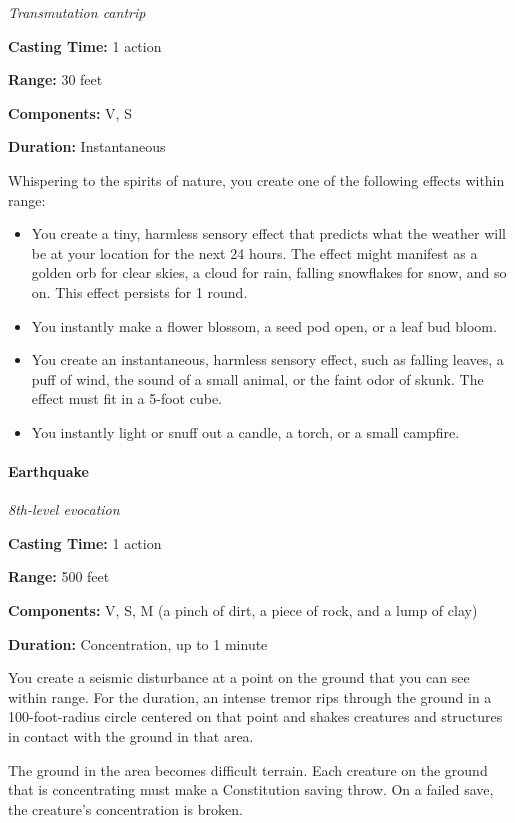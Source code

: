 \documentclass[
]{article}
\providecommand{\tightlist}{%
  \setlength{\itemsep}{0pt}\setlength{\parskip}{0pt}}
\begin{document}
\emph{Transmutation cantrip}

\textbf{Casting Time:} 1 action

\textbf{Range:} 30 feet

\textbf{Components:} V, S

\textbf{Duration:} Instantaneous

Whispering to the spirits of nature, you create one of the following
effects within range:

\begin{itemize}
\tightlist
\item
  You create a tiny, harmless sensory effect that predicts what the
  weather will be at your location for the next 24 hours. The effect
  might manifest as a golden orb for clear skies, a cloud for rain,
  falling snowflakes for snow, and so on. This effect persists for 1
  round.
\item
  You instantly make a flower blossom, a seed pod open, or a leaf bud
  bloom.
\item
  You create an instantaneous, harmless sensory effect, such as falling
  leaves, a puff of wind, the sound of a small animal, or the faint odor
  of skunk. The effect must fit in a 5-foot cube.
\item
  You instantly light or snuff out a candle, a torch, or a small
  campfire.
\end{itemize}

\hypertarget{earthquake}{%
\paragraph{Earthquake}\label{earthquake}}

\emph{8th-level evocation}

\textbf{Casting Time:} 1 action

\textbf{Range:} 500 feet

\textbf{Components:} V, S, M (a pinch of dirt, a piece of rock, and a
lump of clay)

\textbf{Duration:} Concentration, up to 1 minute

You create a seismic disturbance at a point on the ground that you can
see within range. For the duration, an intense tremor rips through the
ground in a 100-foot-radius circle centered on that point and shakes
creatures and structures in contact with the ground in that area.

The ground in the area becomes difficult terrain. Each creature on the
ground that is concentrating must make a Constitution saving throw. On a
failed save, the creature's concentration is broken.
\end{document}
